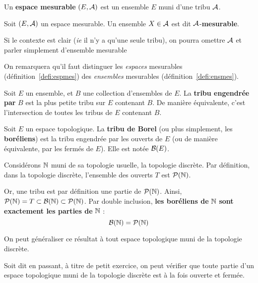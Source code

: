 \documentclass[../integ-proba.tex]{subfiles}
\begin{document}
  \begin{defi}
    \label{defi:espmes}
    Un \textbf{espace mesurable} $\left(E, \mathcal{A}\right)$ est un ensemble $E$ muni d'une tribu $\mathcal{A}$.
  \end{defi}

  \begin{defi}
    \label{defi:ensmes}
    Soit $\left(E, \mathcal{A}\right)$ un espace mesurable.
    Un ensemble $X\in \mathcal{A}$ est dit $\mathcal{A}$-\textbf{mesurable}.
  \end{defi}

  \begin{rem}
    Si le contexte est clair (\textit{ie} il n'y a qu'une seule tribu), on pourra omettre $\mathcal{A}$ et parler simplement d'ensemble mesurable
  \end{rem}

  \begin{rem}
    On remarquera qu'il faut distinguer les \textit{espaces} mesurables (définition~\ref{defi:espmes}) des \textit{ensembles} mesurables (définition~\ref{defi:ensmes}).
  \end{rem}

  \begin{defi}
    Soit $E$ un ensemble, et $B$ une collection d'ensembles de $E$.
    La \textbf{tribu engendrée par} $B$ est la plus petite tribu sur $E$ contenant $B$.
    De manière équivalente, c'est l'intersection de toutes les tribus de $E$ contenant $B$.
  \end{defi}

  \begin{defi}
    \label{defi:Borel}
    Soit $E$ un espace topologique.
    La \textbf{tribu de Borel} (ou plus simplement, les \textbf{boréliens}) est la tribu engendrée par les ouverts de $E$ (ou de manière équivalente, par les fermés de $E$).
    Elle est notée $\mathcal{B}(E)$.
  \end{defi}

  \begin{exemple}
    \label{exemple:boreliens_et_topologie_discrete}
    Considérons $\mathbb{N}$ muni de sa topologie usuelle, la topologie discrète.
    Par définition, dans la topologie discrète, l'ensemble des ouverts $T$ est $\mathcal{P}(\mathbb{N})$.

    Or, une tribu est par définition une partie de $\mathcal{P}(\mathbb{N})$.
    Ainsi, $\mathcal{P}(\mathbb{N}) = T \subset \mathcal{B}(\mathbb{N}) \subset \mathcal{P}(\mathbb{N})$.
    Par double inclusion, \textbf{les boréliens de} $\mathbb{N}$ \textbf{sont exactement les parties de} $\mathbb{N}$ :
    \begin{displaymath}
      \mathcal{B}(\mathbb{N}) = \mathcal{P}(\mathbb{N})
    \end{displaymath}

    On peut généraliser ce résultat à tout espace topologique muni de la topologie discrète.

    Soit dit en passant, à titre de petit exercice, on peut vérifier que toute partie d'un espace topologique muni de la topologie discrète est à la fois ouverte et fermée.
  \end{exemple}
\end{document}
